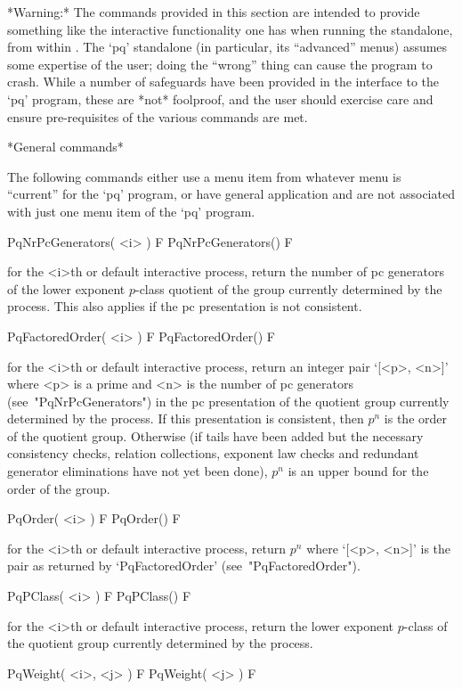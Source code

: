 *Warning:*
The commands provided in this section are intended to  provide  something
like the interactive functionality one has when running  the  standalone,
from within {\GAP}. The `pq' standalone (in particular, its  ``advanced''
menus) assumes some expertise of the user; doing the ``wrong'' thing  can
cause the program to crash.  While  a  number  of  safeguards  have  been
provided in the {\GAP} interface to the `pq'  program,  these  are  *not*
foolproof, and the user should exercise care and ensure pre-requisites of
the various commands are met.

*General commands*

The following commands either use a  menu  item  from  whatever  menu  is
``current'' for the `pq' program, or have general application and are  not
associated with just one menu item of the `pq' program.

\>PqNrPcGenerators( <i> ) F
\>PqNrPcGenerators() F

for the <i>th or default  interactive {\ANUPQ} process, return the number
of pc  generators of the lower  exponent $p$-class quotient  of the group
currently  determined  by the  process.   This  also  applies if  the  pc
presentation is not consistent.

\>PqFactoredOrder( <i> ) F
\>PqFactoredOrder() F

for the <i>th or default interactive {\ANUPQ} process, return an  integer
pair `[<p>, <n>]' where <p> is a prime  and  <n>  is  the  number  of  pc
generators  (see~"PqNrPcGenerators")  in  the  pc  presentation  of   the
quotient group currently determined by the process. If this  presentation
is consistent, then $p^n$ is the order of the quotient  group.  Otherwise
(if tails have been added but the necessary consistency checks,  relation
collections, exponent law checks  and  redundant  generator  eliminations
have not yet been done), $p^n$ is an upper bound for  the  order  of  the
group.

\>PqOrder( <i> ) F
\>PqOrder() F

for the <i>th or default  interactive  {\ANUPQ}  process,  return  $p^n$
where  `[<p>,  <n>]'  is  the  pair  as  returned  by   `PqFactoredOrder'
(see~"PqFactoredOrder").

\>PqPClass( <i> ) F
\>PqPClass() F

for the <i>th or default interactive {\ANUPQ} process, return  the  lower
exponent $p$-class of the quotient  group  currently  determined  by  the
process.

\>PqWeight( <i>, <j> ) F
\>PqWeight( <j> ) F

